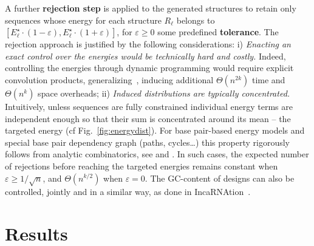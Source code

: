 \documentclass{bioinfo}
\newcommand{\Def}[1]{{\bfseries #1}}
\newcommand{\TargetE}{E^{\star}}
\newcommand{\Nuc}[1]{{\sf #1}}
\newcommand{\Cb}{\Nuc{C}}
\newcommand{\Gb}{\Nuc{G}}
\newcommand{\GCb}{\Gb\Cb}
\newcommand{\Software}[1]{{\ttfamily #1}}
\begin{document}
A further \Def{rejection step} is applied to the generated structures to retain only sequences whose energy for each structure $R_\ell$ belongs to $[\TargetE_\ell\cdot(1-\varepsilon),\TargetE_\ell\cdot(1+\varepsilon)]$, for $\varepsilon\ge 0$ some predefined \Def{tolerance}. The rejection approach is justified by the following considerations:
i) \emph{Enacting an exact control over the energies would  be technically hard and costly.} Indeed, controlling the energies through dynamic programming would require explicit convolution products, generalizing~\citet{Cupal1996}, inducing additional $\Theta(n^{2k})$ time and $\Theta(n^k)$ space overheads;
ii) \emph{Induced distributions are typically concentrated.} Intuitively, unless sequences are fully constrained individual energy terms are independent enough so that their sum is concentrated around its mean -- the targeted energy (cf Fig.~\ref{fig:energydist}).
For base pair-based energy models and special base pair dependency graph
(paths, cycles\ldots) this property rigorously follows from analytic
combinatorics, see \citet{Bender1983} and
\citet{Drmota1997}. In such cases, the expected number of
rejections before reaching the targeted energies remains constant when
$\varepsilon\ge 1/\sqrt{n}$, and $\Theta(n^{k/2})$ when
$\varepsilon=0$. The \GCb-content of designs can also be controlled,
jointly and in a similar way, as done in
\Software{IncaRNAtion}~\citep{Reinharz2013}.


\section{Results}\label{sec:results}
\end{document}
